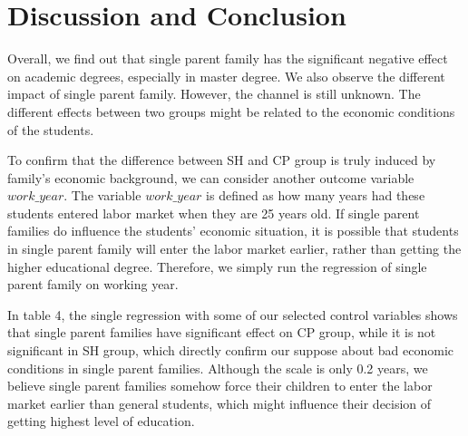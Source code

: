 \documentclass[]{AEA}
\begin{document}
\section{Discussion and Conclusion}

    Overall, we find out that single parent family has the significant negative effect on academic degrees, especially in master degree. We also observe the different impact of single parent family. However, the channel is still unknown. The different effects between two groups might be related to the economic conditions of the students. 

    To confirm that the difference between SH and CP group is truly induced by family's economic background, we can consider another outcome variable $work\_year$.  The variable $work\_year$ is defined as how many years had these students entered labor market when they are 25 years old. If single parent families do influence the students' economic situation, it is possible that students in single parent family will enter the labor market earlier, rather than getting the higher educational degree.  Therefore, we simply run the regression of single parent family on working year.

    In table 4, the single regression with some of our selected control variables shows that single parent families have significant effect on CP group, while it is not significant in SH group, which directly confirm our suppose about bad economic conditions in single parent families. Although the scale is only 0.2 years, we believe single parent families somehow force their children to enter the labor market earlier than general students, which might influence their decision of getting highest level of education.
\end{document}
